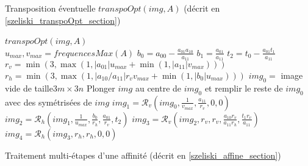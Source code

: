    \begin{algorithme}
    \caption{Transposition éventuelle $transpoOpt(img,A)$ (décrit en \ref{szeliski_transpoOpt_section})}
    \label{szeliski_transpoOpt}
   \end{algorithme}
  
   \begin{algorithme}
    $transpoOpt(img,A)$\;\ \\
    $u_{max}, v_{max} = frequencesMax(A)$\;
	$b_0 = a_{00}-\frac{a_{01}a_{10}}{a_{11}}$\;
	$b_1 = \frac{a_{01}}{a_{11}}$\;
	$t_2 = t_0 - \frac{a_{01}t_1}{a_{11}}$\;
	$r_v = \min(3,\max (1,|a_{01}|u_{max}+\min (1,|a_{11}|v_{max})))$\;
	$r_h = \min(3,\max (1,|a_{10}/a_{11}|r_vv_{max}+\min (1,|b_0|u_{max})))$\;
	$img_0 =$ image vide de taille$3m \times 3n$\;
	Plonger $img$ au centre de $img_0$ et remplir le reste de $img_0$ avec des symétrisées de $img$\;
	$img_1 = \mathcal{R}_v(img_0,\frac{1}{v_{max}},\frac{a_{11}}{r_v},0,0)$\;
	$img_2 = \mathcal{R}_h(img_1,\frac{1}{u_{max}},\frac{b_0}{r_h},\frac{a_{01}}{r_v},t_2)$\;
	$img_3 = \mathcal{R}_v(img_2,r_v,r_v,\frac{a_{10}r_v}{a_{11}r_h},\frac{t_1r_v}{a_{11}})$\;
	$img_4 = \mathcal{R}_h(img_3,r_h,r_h,0,0)$\;
    \caption{Traitement multi-étapes d'une affinité (décrit en \ref{szeliski_affine_section})}
    \label{szeliski_affine}
   \end{algorithme}










